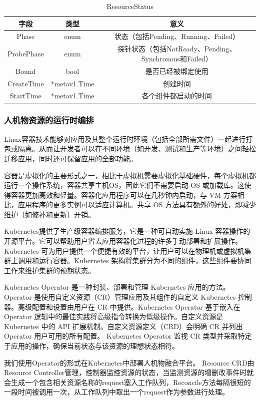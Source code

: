 \documentclass[12pt,a4paper]{article}
\theoremstyle{definition}
\begin{document}
\begin{table}[!htbp]
\centering
\begin{tabular}{ccc}
  \toprule
  字段& 类型& 意义\\
  \midrule
  Phase& enum& 状态（包括Pending、Running、Failed）\\
  ProbePhase& enum& 探针状态（包括NotReady、Pending、Synchronous和Failed）\\
  Bound& bool& 是否已经被绑定使用\\
  CreateTime& *metav1.Time& 创建时间\\
  StartTime& *metav1.Time& 各个组件都启动的时间\\
  \bottomrule
\end{tabular}
\caption{ResourceStatus}
\end{table}

\subsubsection{人机物资源的运行时编排}

Linux容器技术能够对应用及其整个运行时环境（包括全部所需文件）一起进行打包或隔离。从而让开发者可以在不同环境（如开发、测试和生产等环境）之间轻松迁移应用，同时还可保留应用的全部功能。

容器是虚拟化的主要形式之一，相比于虚拟机需要虚拟化基础硬件，每个虚拟机都运行一个操作系统，容器共享主机OS，因此它们不需要启动 OS 或加载库。这使得容器更加高效和轻量。容器化应用程序可以在几秒钟内启动，与 VM 方案相比，应用程序的更多实例可以适应计算机。共享 OS 方法具有额外的好处，即减少维护（如修补和更新）开销。

Kubernetes提供了生产级容器编排服务，它是一种可自动实施 Linux 容器操作的开源平台。它可以帮助用户省去应用容器化过程的许多手动部署和扩展操作。Kubernetes 可为用户提供一个便捷有效的平台，让用户可以在物理机或虚拟机集群上调用和运行容器。Kubernetes 架构将集群分为不同的组件，这些组件要协同工作来维护集群的预期状态。

Kubernetes Operator 是一种封装、部署和管理 Kubernetes 应用的方法。Operator 是使用自定义资源（CR）管理应用及其组件的自定义 Kubernetes 控制器。高级配置和设置由用户在 CR 中提供。Kubernetes Operator 基于嵌入在 Operator 逻辑中的最佳实践将高级指令转换为低级操作。自定义资源是 Kubernetes 中的 API 扩展机制。自定义资源定义（CRD）会明确 CR 并列出 Operator 用户可用的所有配置。 Kubernetes Operator 监视 CR 类型并采取特定于应用的操作，确保当前状态与该资源的理想状态相符。

我们使用Operator的形式在Kubernetes中部署人机物融合平台。
Resource CRD由Resource Controller管理，控制器监控资源的状态，当监测资源的增删改事件时就会生成一个包含相关资源名称的request塞入工作队列，Reconcile方法每隔很短的一段时间被调用一次，从工作队列中取出一个request作为参数进行处理。
\end{document}

